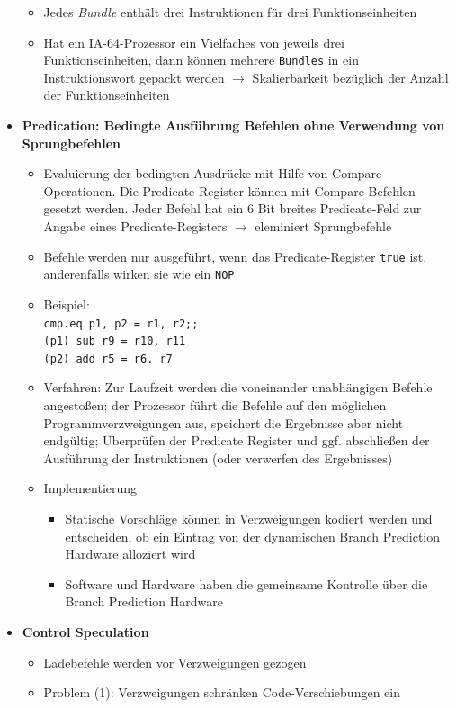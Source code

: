 \begin{itemize}
\begin{itemize}
		\item Jedes \textit{Bundle} enthält drei Instruktionen für drei Funktionseinheiten
		\item Hat ein IA-64-Prozessor ein Vielfaches von jeweils drei Funktionseinheiten, dann können mehrere \texttt{Bundles} in ein Instruktionswort gepackt werden \(\rightarrow\) Skalierbarkeit bezüglich der Anzahl der Funktionseinheiten
	\end{itemize}
	\item \textbf{Predication: Bedingte Ausführung Befehlen ohne Verwendung von Sprungbefehlen}
	\begin{itemize}
		\item Evaluierung der bedingten Ausdrücke mit Hilfe von Compare-Operationen. Die Predicate-Register können mit Compare-Befehlen gesetzt werden. Jeder Befehl hat ein 6 Bit breites Predicate-Feld zur Angabe eines Predicate-Registers \(\rightarrow\) eleminiert Sprungbefehle
		\item Befehle werden nur ausgeführt, wenn das Predicate-Register \texttt{true} ist, anderenfalls wirken sie wie ein \texttt{NOP}
		\item Beispiel:\\ \texttt{cmp.eq p1, p2 = r1, r2;;\\(p1) sub r9 = r10, r11\\(p2) add r5 = r6. r7}
		\item Verfahren: Zur Laufzeit werden die voneinander unabhängigen Befehle angestoßen; der Prozessor führt die Befehle auf den möglichen Programmverzweigungen aus, speichert die Ergebnisse aber nicht endgültig; Überprüfen der Predicate Register und ggf. abschließen der Ausführung der Instruktionen (oder verwerfen des Ergebnisses)
		\item Implementierung
		\begin{itemize}
			\item Statische Vorschläge können in Verzweigungen kodiert werden und entscheiden, ob ein Eintrag von der dynamischen Branch Prediction Hardware alloziert wird
			\item Software und Hardware haben die gemeinsame Kontrolle über die Branch Prediction Hardware
		\end{itemize}
	\end{itemize}
	\item \textbf{Control Speculation}
	\begin{itemize}
		\item Ladebefehle werden vor Verzweigungen gezogen
		\item Problem (1): Verzweigungen schränken Code-Verschiebungen ein

\end{itemize}
\end{itemize}
